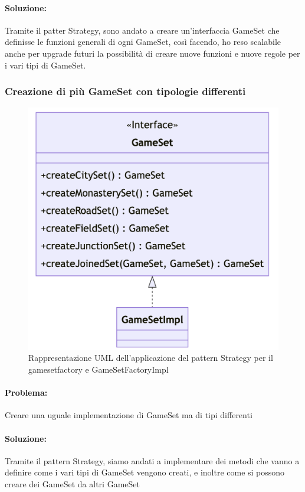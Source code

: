 \paragraph{Soluzione:}
Tramite il patter Strategy, sono andato a creare un'interfaccia GameSet che definisse le funzioni generali di ogni GameSet, così facendo, ho reso scalabile anche per upgrade futuri la possibilità di creare nuove funzioni e nuove regole per i vari tipi di GameSet.

\subsubsection*{Creazione di più GameSet con tipologie differenti}
\begin{figure}[ht]
    \centering\includegraphics[scale=.3]{images/gamesetfactory.png}
    \caption{Rappresentazione UML dell'applicazione del pattern Strategy per il gamesetfactory e GameSetFactoryImpl}
\end{figure}

\paragraph{Problema:}
Creare una uguale implementazione di GameSet ma di tipi differenti
\paragraph{Soluzione:}
Tramite il pattern Strategy, siamo andati a implementare dei metodi che vanno a definire come i vari tipi di GameSet vengono creati, e inoltre come si possono creare dei GameSet da altri GameSet

